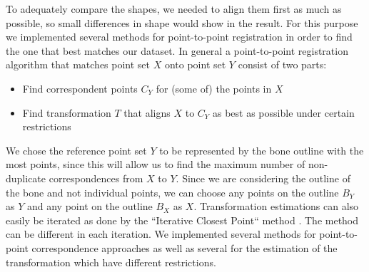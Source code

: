 \documentclass[pdftex,12pt,a4paper]{report}
\begin{document}
To adequately compare the shapes, we needed to align them first as much as possible, so small differences in shape would
show in the result. For this purpose we implemented several methods for point-to-point registration in order
to find the one that best matches our dataset. In general a point-to-point registration algorithm that matches point set
$X$ onto point set $Y$ consist of two parts:

\begin{itemize}
\item Find correspondent points $C_Y$ for (some of) the points in $X$
\item Find transformation $T$ that aligns $X$ to $C_Y$ as best as possible under certain restrictions
\end{itemize}

We chose the reference point set $Y$ to be represented by the bone outline with the most points, since this will allow
us to find the maximum number of non-duplicate correspondences from $X$ to $Y$. Since we are considering the outline of the bone and not
individual points, we can choose any points on the outline $B_Y$ as $Y$ and any point on the outline $B_X$ as $X$.
Transformation estimations can also easily be iterated as done by the ``Iterative Closest Point`` method \cite{besl1992method}.
The method can be different in each iteration. We implemented several methods for point-to-point correspondence
approaches as well as several for the estimation of the transformation which have different restrictions.
\end{document}
